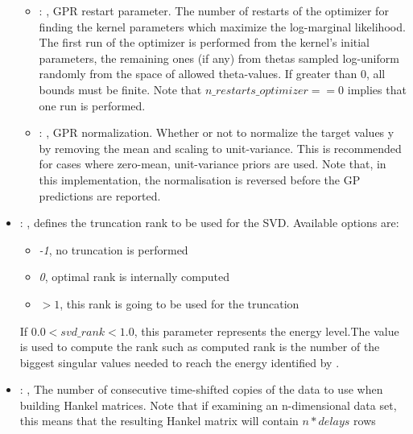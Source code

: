 \begin{itemize}
\begin{itemize}
        \item {}: , 
          GPR restart parameter. The number of restarts of the optimizer for finding the
          kernel parameters which maximize the log-marginal likelihood. The first run of the
          optimizer                                                  is performed from the kernel’s
          initial parameters, the remaining ones (if any) from thetas
          sampled log-uniform randomly from the space of allowed theta-values. If greater than 0,
          all bounds must be finite. Note that $n\_restarts\_optimizer == 0$ implies that one run is
          performed.

        \item {}: , 
          GPR normalization. Whether or not to normalize the target values y by removing the mean
          and scaling                                                  to unit-variance. This is
          recommended for cases where zero-mean, unit-variance priors are used.
          Note that, in this implementation, the normalisation is reversed before the GP predictions
          are reported.
      \end{itemize}

    \item {}: , 
      defines the truncation rank to be used for the SVD.
      Available options are:                                                  \begin{itemize}
      \item \textit{-1}, no truncation is performed
      \item \textit{0}, optimal rank is internally computed
      \item \textit{$>1$}, this rank is going to be used for the truncation
      \end{itemize}                                                  If $0.0 < svd\_rank < 1.0$, this
      parameter represents the energy level.The value is used to compute the rank such
      as computed rank is the number of the biggest singular values needed to reach the energy
      identified by                                                    .

    \item {}: , 
      The number of consecutive time-shifted copies of the data to use when building Hankel
      matrices.                                                  Note that if examining an
      n-dimensional data set, this means that the resulting Hankel matrix
      will contain $n * delays$ rows


\end{itemize}
